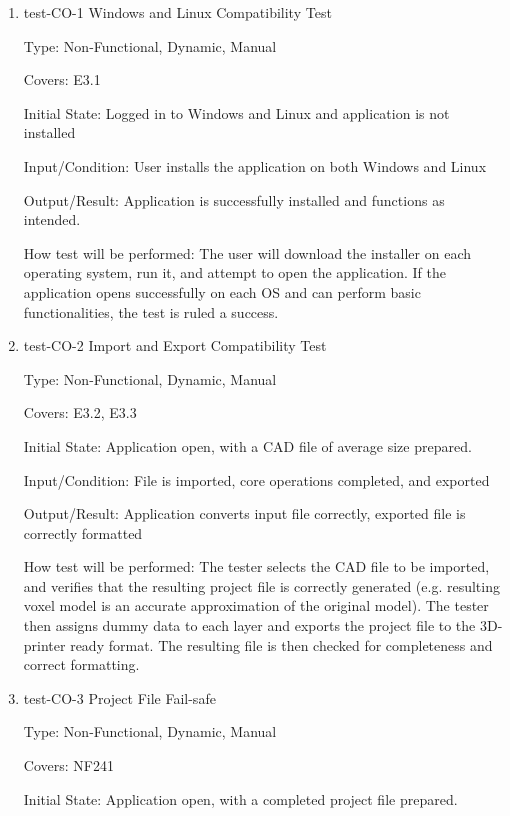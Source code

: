 \documentclass[12pt, titlepage]{article}
\begin{document}
\begin{enumerate}

\item{test-CO-1 Windows and Linux Compatibility Test\\}

Type: Non-Functional, Dynamic, Manual

Covers: E3.1
					
Initial State: Logged in to Windows and Linux and application is not installed
					
Input/Condition: User installs the application on both Windows and Linux
					
Output/Result: Application is successfully installed and functions as intended.
					
How test will be performed: The user will download the installer on each operating system, run it, and attempt to open the
application. If the application opens successfully on each OS and can perform basic functionalities, the test is ruled a success.
					
\item{test-CO-2 Import and Export Compatibility Test\\}

Type: Non-Functional, Dynamic, Manual

Covers: E3.2, E3.3
					
Initial State: Application open, with a CAD file of average size prepared.
					
Input/Condition: File is imported, core operations completed, and exported
					
Output/Result: Application converts input file correctly, exported file is correctly formatted
					
How test will be performed: The tester selects the CAD file to be imported, and verifies that the resulting project file 
is correctly generated (e.g. resulting voxel model is an accurate approximation of the original model). The tester then assigns 
dummy data to each layer and exports the project file to the 3D-printer ready format. The resulting file is then checked for
completeness and correct formatting. 

\item{test-CO-3 Project File Fail-safe\\} 

Type: Non-Functional, Dynamic, Manual

Covers: NF241
					
Initial State: Application open, with a completed project file prepared.
					

\end{enumerate}
\end{document}
